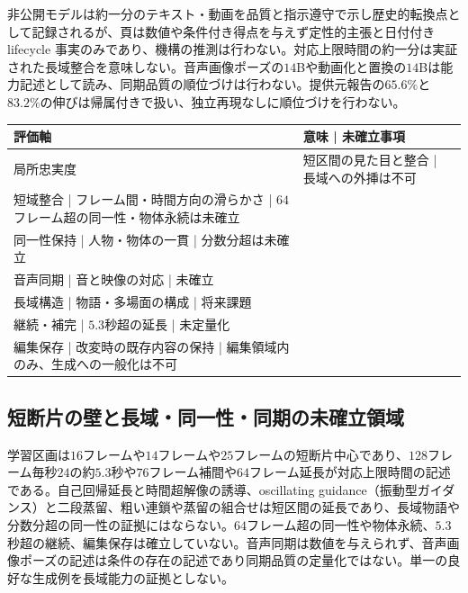 \documentclass[lualatex,a4paper,10pt]{jlreq}
\begin{document}
\begin{center}
\small
非公開モデルは約一分のテキスト・動画を品質と指示遵守で示し歴史的転換点として記録されるが、頁は数値や条件付き得点を与えず定性的主張と日付付き lifecycle 事実のみであり、機構の推測は行わない\autocite{btd077}。対応上限時間の約一分は実証された長域整合を意味しない\autocite{btd077}。音声画像ポーズの$14$Bや動画化と置換の$14$Bは能力記述として読み、同期品質の順位づけは行わない\autocite{btd124}。提供元報告の$65.6\%$と$83.2\%$の伸びは帰属付きで扱い、独立再現なしに順位づけを行わない\autocite{btd124}。

\begin{tabularx}{\textwidth}{@{}p{}p{}X@{}}
\toprule
評価軸 & 意味 | 未確立事項 \\
\midrule
局所忠実度\autocite{btd070,btd071} & 短区間の見た目と整合 | 長域への外挿は不可 \\
短域整合\autocite{btd070,btd073} | フレーム間・時間方向の滑らかさ | $64$フレーム超の同一性・物体永続は未確立 \\
同一性保持\autocite{btd074,btd075} | 人物・物体の一貫 | 分数分超は未確立 \\
音声同期\autocite{btd074,btd075} | 音と映像の対応 | 未確立 \\
長域構造\autocite{btd073} | 物語・多場面の構成 | 将来課題 \\
継続・補完\autocite{btd074,btd075} | $5.3$秒超の延長 | 未定量化 \\
編集保存\autocite{btd138} | 改変時の既存内容の保持 | 編集領域内のみ、生成への一般化は不可 \\
\bottomrule
\end{tabularx}
\end{center}

\subsection{短断片の壁と長域・同一性・同期の未確立領域}
学習区画は$16$フレームや$14$フレームや$25$フレームの短断片中心であり、$128$フレーム毎秒$24$の約$5.3$秒や$76$フレーム補間や$64$フレーム延長が対応上限時間の記述である\autocite{btd070,btd071,btd073,btd075}。自己回帰延長と時間超解像の誘導、oscillating guidance（振動型ガイダンス）と二段蒸留、粗い連鎖や蒸留の組合せは短区間の延長であり、長域物語や分数分超の同一性の証拠にはならない\autocite{btd070,btd071,btd073}。$64$フレーム超の同一性や物体永続、$5.3$秒超の継続、編集保存は確立していない\autocite{btd070,btd071,btd074,btd075}。音声同期は数値を与えられず、音声画像ポーズの記述は条件の存在の記述であり同期品質の定量化ではない\autocite{btd077,btd124}。単一の良好な生成例を長域能力の証拠としない\autocite{btd138}。
\end{document}

